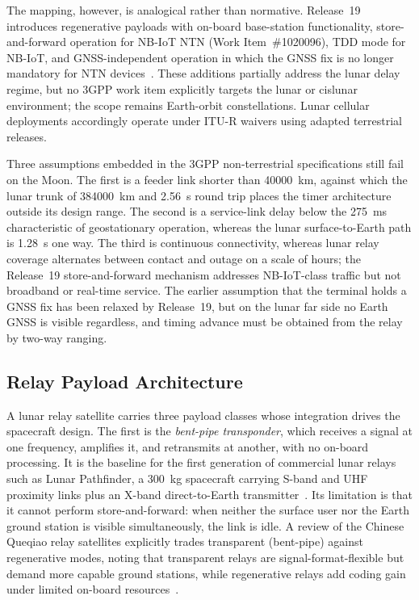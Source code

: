 \documentclass[11pt,a4paper]{article}
\begin{document}
The mapping, however, is analogical rather than normative. Release~19 introduces regenerative payloads with on-board base-station functionality, store-and-forward operation for NB-IoT NTN (Work Item~\#1020096), TDD mode for NB-IoT, and GNSS-independent operation in which the GNSS fix is no longer mandatory for NTN devices~\cite{3gpp_rel19_ntn}. These additions partially address the lunar delay regime, but no 3GPP work item explicitly targets the lunar or cislunar environment; the scope remains Earth-orbit constellations. Lunar cellular deployments accordingly operate under ITU-R waivers using adapted terrestrial releases.

Three assumptions embedded in the 3GPP non-terrestrial specifications still fail on the Moon. The first is a feeder link shorter than \SI{40000}{km}, against which the lunar trunk of \SI{384000}{km} and \SI{2.56}{\second} round trip places the timer architecture outside its design range. The second is a service-link delay below the \SI{275}{ms} characteristic of geostationary operation, whereas the lunar surface-to-Earth path is \SI{1.28}{\second} one way. The third is continuous connectivity, whereas lunar relay coverage alternates between contact and outage on a scale of hours; the Release~19 store-and-forward mechanism addresses NB-IoT-class traffic but not broadband or real-time service. The earlier assumption that the terminal holds a GNSS fix has been relaxed by Release~19, but on the lunar far side no Earth GNSS is visible regardless, and timing advance must be obtained from the relay by two-way ranging.

\subsection{Relay Payload Architecture}
A lunar relay satellite carries three payload classes whose integration drives the spacecraft design. The first is the \emph{bent-pipe transponder}, which receives a signal at one frequency, amplifies it, and retransmits at another, with no on-board processing. It is the baseline for the first generation of commercial lunar relays such as Lunar Pathfinder, a \SI{300}{kg} spacecraft carrying S-band and UHF proximity links plus an X-band direct-to-Earth transmitter~\cite{davies_pathfinder_2023,sstl_pathfinder_guide}. Its limitation is that it cannot perform store-and-forward: when neither the surface user nor the Earth ground station is visible simultaneously, the link is idle. A review of the Chinese Queqiao relay satellites explicitly trades transparent (bent-pipe) against regenerative modes, noting that transparent relays are signal-format-flexible but demand more capable ground stations, while regenerative relays add coding gain under limited on-board resources~\cite{queqiao_relay_review_2021}.
\end{document}

